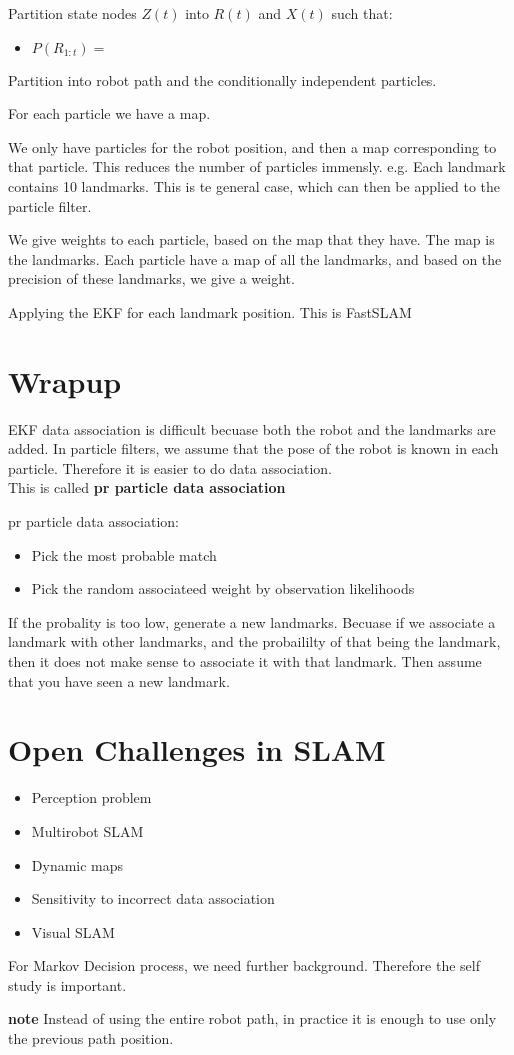 \documentclass[a4paper]{article}
\begin{document}
Partition state nodes $ Z(t) $ into $ R(t) $ and $ X(t) $ such that:
\begin{itemize}
	\item $ P(R_{1:t}) = $
\end{itemize}

Partition into robot path and the conditionally independent particles. 

For each particle we have a map.

We only have particles for the robot position, and then a map corresponding to that particle. This reduces the number of particles immensly. e.g. Each landmark contains 10 landmarks. 
This is te general case, which can then be applied to the particle filter. 

We give weights to each particle, based on the map that they have. 
The map is the landmarks. Each particle have a map of all the landmarks, and based on the precision of these landmarks, we give a weight.

Applying the EKF for each landmark position.
This is FastSLAM


\section{Wrapup}
EKF data association is difficult becuase both the robot and the landmarks are added. In particle filters, we assume that the pose of the robot is known in each particle. Therefore it is easier to do data association. \\
This is called \textbf{pr particle data association}  

pr particle data association:
\begin{itemize}
	\item Pick the most probable match
	\item Pick the random associateed weight by observation likelihoods
\end{itemize}
If the probality is too low, generate a new landmarks. Becuase if we associate a landmark with other landmarks, and the probaililty of that being the landmark, then it does not make sense to associate it with that landmark. Then assume that you have seen a new landmark.


\section{Open Challenges in SLAM}
\begin{itemize}
	\item Perception problem
	\item Multirobot SLAM
	\item Dynamic maps
	\item Sensitivity to incorrect data association
	\item Visual SLAM
\end{itemize}

For Markov Decision process, we need further background. Therefore the self study is important.

\vspace{5pt}

\textbf{note} Instead of using the entire robot path, in practice it is enough to use only the previous path position. 
\end{document}
